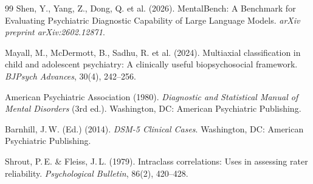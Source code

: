 \documentclass[11pt,a4paper]{article}
\begin{document}
\begin{thebibliography}{99}
Shen, Y., Yang, Z., Dong, Q. et al. (2026).
\newblock MentalBench: A Benchmark for Evaluating Psychiatric Diagnostic Capability of Large Language Models.
\newblock \textit{arXiv preprint arXiv:2602.12871}.

Mayall, M., McDermott, B., Sadhu, R. et al. (2024).
\newblock Multiaxial classification in child and adolescent psychiatry: A clinically useful biopsychosocial framework.
\newblock \textit{BJPsych Advances}, 30(4), 242--256.

American Psychiatric Association (1980).
\newblock \textit{Diagnostic and Statistical Manual of Mental Disorders} (3rd ed.).
\newblock Washington, DC: American Psychiatric Publishing.

Barnhill, J.\,W. (Ed.) (2014).
\newblock \textit{DSM-5 Clinical Cases}.
\newblock Washington, DC: American Psychiatric Publishing.

Shrout, P.\,E. \& Fleiss, J.\,L. (1979).
\newblock Intraclass correlations: Uses in assessing rater reliability.
\newblock \textit{Psychological Bulletin}, 86(2), 420--428.

\end{thebibliography}
\end{document}

